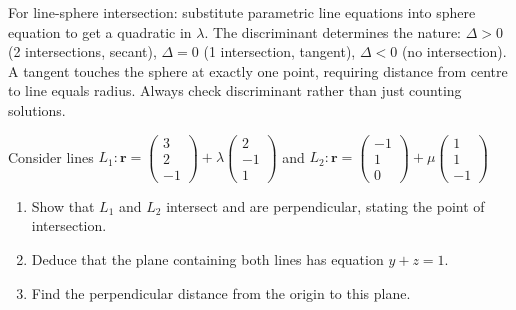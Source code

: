 \begin{takeaways}
For line-sphere intersection: substitute parametric line equations into sphere equation to get a quadratic in $\lambda$. The discriminant determines the nature: $\Delta > 0$ (2 intersections, secant), $\Delta = 0$ (1 intersection, tangent), $\Delta < 0$ (no intersection). A tangent touches the sphere at exactly one point, requiring distance from centre to line equals radius. Always check discriminant rather than just counting solutions.
\end{takeaways}

\vspace{1em}

\begin{problem}
Consider lines $L_1: \mathbf{r} = \begin{pmatrix} 3 \\ 2 \\ -1 \end{pmatrix} + \lambda \begin{pmatrix} 2 \\ -1 \\ 1 \end{pmatrix}$ and 
$L_2: \mathbf{r} = \begin{pmatrix} -1 \\ 1 \\ 0 \end{pmatrix} + \mu \begin{pmatrix} 1 \\ 1 \\ -1 \end{pmatrix}$
\begin{enumerate}[label=(\roman*)]
    \item Show that $L_1$ and $L_2$ intersect and are perpendicular, stating the point of intersection.
    \item Deduce that the plane containing both lines has equation $y+z=1$.
    \item Find the perpendicular distance from the origin to this plane.
\end{enumerate}
\end{problem}

